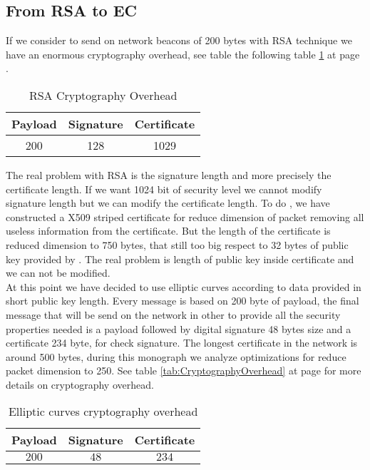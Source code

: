 \subsection{From RSA to EC}
If we consider to send on network beacons of 200 bytes with RSA technique we have an enormous cryptography overhead, see table the following table \ref{tab:RSAOverHead} at page \pageref{tab:RSAOverHead}.
\begin{table}[!ht]
	\centering
	\caption{RSA Cryptography Overhead}
	\begin{tabular}{|c|c|c|}
	\hline\hline 
	\textbf{Payload} & \textbf{Signature} & \textbf{Certificate}\\
	\hline
	200 & 128 & 1029 \\
	\hline
	\hline     %
 	\end{tabular} 
	\label{tab:RSAOverHead}
\end{table}
The real problem with RSA is the signature length and more precisely the  certificate length. If we want 1024 bit of security level we cannot modify signature length but we can modify the  certificate length. To do , we have constructed a X509 striped certificate for reduce dimension of packet removing all useless  information from the  certificate. But the length of the certificate is reduced dimension to 750 bytes, that still too big respect to 32 bytes of public key  provided by \cite{calandriello}. The real problem is length of public key inside certificate and we can not be modified.\\
At this point we have decided to use elliptic curves according to data  provided in \cite{calandriello} short public key length. Every message is based on 200 byte of payload, the final message that will be send on the  network in other to provide all the security properties needed is a payload followed by digital signature 48 bytes size and a certificate 234 byte, for check signature. The longest certificate in the network is around 500 bytes, during this monograph we analyze optimizations for reduce packet dimension to 250. See table \ref{tab:CryptographyOverhead} at page \pageref{tab:CryptographyOverhead} for more details on cryptography overhead.
\begin{table}[!ht]
	\centering
	\caption{Elliptic curves cryptography overhead}
	\begin{tabular}{|c|c|c|}
	\hline\hline 
	\textbf{Payload} & \textbf{Signature} & \textbf{Certificate}\\
	\hline
	$200$ &	$48$ & $234$\\
	\hline
	\hline     %
 	\end{tabular} 
	\label{tab:MessagesOnNetwork}
\end{table}
